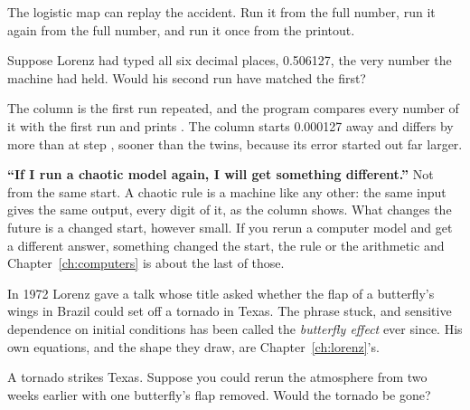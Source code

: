 The logistic map can replay the accident. Run it from the full number, run
it again from the full number, and run it once from the printout.

\begin{think}
Suppose Lorenz had typed all six decimal places, \num{0.506127}, the very
number the machine had held. Would his second run have matched the first?
\end{think}



\noindent
The column  is the first run repeated, and the program compares
every number of it with the first run and prints . The column
 starts \num{0.000127} away and differs by more than
 at step , sooner than the twins, because
its error started out far larger.

\begin{trapbox}
\textbf{\enquote{If I run a chaotic model again, I will get something
different.}} Not from the same start. A chaotic rule is a machine like any
other: the same input gives the same output, every digit of it, as the
 column shows. What changes the future is a changed start,
however small. If you rerun a computer model and get a different answer,
something changed \dash{} the start, the rule or the arithmetic \dash{} and
Chapter~\ref{ch:computers} is about the last of those.
\end{trapbox}

\noindent
In 1972 Lorenz gave a talk whose title asked whether the flap of a
butterfly's wings in Brazil could set off a tornado in Texas. The phrase
stuck, and sensitive dependence on initial conditions has been called the
\emph{butterfly effect} ever since. His own equations, and the shape they
draw, are Chapter~\ref{ch:lorenz}'s.

\begin{think}
A tornado strikes Texas. Suppose you could rerun the atmosphere from two
weeks earlier with one butterfly's flap removed. Would the tornado be gone?
\end{think}

